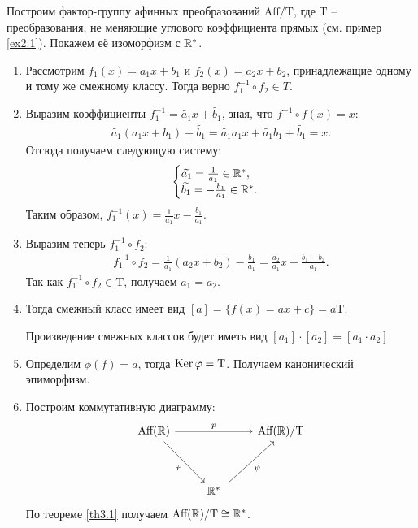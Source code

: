 \begin{example}
    Построим фактор-группу афинных преобразований $\text{Aff}/\text{T}$, где $\text{T}$ -- преобразования, не меняющие 
    углового коэффициента прямых (см. пример \ref{ex2.1}). Покажем её изоморфизм с $\mathbb{R}^*$. 
    \begin{enumerate}
        \item 
        Рассмотрим $f_1(x) = a_1 x + b_1$ и $f_2(x) = a_2 x + b_2$, принадлежащие одному и тому же 
        смежному классу. Тогда верно $f_1^{-1} \circ f_2 \in T$. 
        
        \item Выразим коэффициенты $f_1^{-1} = 
        \widetilde{a_1} x + \widetilde{b_1}$, зная, что $f^{-1}\circ f (x) = x$:
        \begin{gather*}
            \widetilde{a_1}(a_1 x + b_1) + \widetilde{b_1} = \widetilde{a_1} a_1 x + \widetilde{a_1} b_1 
            + \widetilde{b_1} = x.
        \end{gather*}
        Отсюда получаем следующую систему:
        \begin{equation*}
            \begin{cases}
              \widetilde{a_1} = \frac{1}{a_1} \in \mathbb{R}^*, 
              \\
              \widetilde{b_1} = - \frac{b_1}{a_1} \in \mathbb{R}^*.
            \end{cases}
        \end{equation*}
        Таким образом, $f_1^{-1}(x) = \frac{1}{a_1} x - \frac{b_1}{a_1}$. 
        \item Выразим теперь $f_1^{-1} \circ f_2$:
        \begin{gather*}
            f_1^{-1} \circ f_2 = \frac{1}{a_1} (a_2 x + b_2) - \frac{b_1}{a_1} = 
            \frac{a_2}{a_1} x + \frac{b_1 - b_2}{a_1}.
        \end{gather*}
        Так как $f_1^{-1} \circ f_2 \in \text{T}$, получаем $a_1 = a_2$. 
        
        \item Тогда смежный класс имеет вид $[a] = \{f(x) = ax + c\} = a\text{T}$.
        
        Произведение смежных классов будет иметь вид $[a_1] \cdot [a_2] = [a_1 \cdot a_2]$
        \item Определим $\phi(f) = a$, тогда $\operatorname{Ker} \varphi = \text{T}$. Получаем канонический эпиморфизм.
        \item Построим коммутативную диаграмму:
        \[
	    \begin{tikzcd}[row sep = huge]
	    	\text{Aff}(\R) \arrow{rr}{p} \arrow[swap]{dr}{\phi} && \text{Aff}(\R)/\text{T} \\
	    	& \R^* \arrow[swap, xshift = 4pt]{ur}{\psi} &
	    \end{tikzcd}
	    \]
        По теореме \ref{th3.1} получаем $\text{Aff}(\mathbb{R})/\text{T} \cong \mathbb{R}^*$.
    \end{enumerate}
\end{example}

